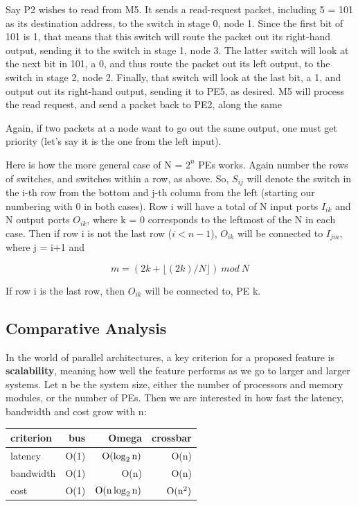 Say P2 wishes to read from M5. It sends a read-request packet, including
5 = 101 as its destination address, to the switch in stage 0, node 1.
Since the first bit of 101 is 1, that means that this switch will route
the packet out its right-hand output, sending it to the switch in stage
1, node 3. The latter switch will look at the next bit in 101, a 0, and
thus route the packet out its left output, to the switch in stage 2,
node 2. Finally, that switch will look at the last bit, a 1, and output
out its right-hand output, sending it to PE5, as desired. M5 will
process the read request, and send a packet back to PE2, along the same

Again, if two packets at a node want to go out the same output, one must
get priority (let's say it is the one from the left input).

Here is how the more general case of N = \( 2^{n} \) PEs works. Again
number the rows of switches, and switches within a row, as above. So, \(
S_{ij} \) will denote the switch in the i-th row from the bottom and
j-th column from the left (starting our numbering with 0 in both cases).
Row i will have a total of N input ports \( I_{ik} \) and N output ports
\( O_{ik} \), where k = 0 corresponds to the leftmost of the N in each
case. Then if row i is not the last row (\( i<n-1 \)), \( O_{ik} \) will
be connected to \( I_{jm} \), where j = i+1 and

\begin{equation}
m = (2k + \lfloor (2k)/N \rfloor ) ~ mod ~ N
\end{equation}

If row i is the last row, then \( O_{ik} \) will be connected to, PE k.


\subsection{Comparative Analysis}

In the world of parallel architectures, a key criterion for a proposed
feature is \textbf{scalability}, meaning how well the feature performs
as we go to larger and larger systems. Let n be the system size, either
the number of processors and memory modules, or the number of PEs. Then
we are interested in how fast the latency, bandwidth and cost grow with
n:

\begin{tabular}{|l|r|r|r|}
\hline 
criterion &
 bus &
 Omega&
 crossbar \\
\hline 
latency &
 O(1) &
 $\rm O( \log_2 n)$ &
 O(n) \\
\hline 
bandwidth &
 O(1) &
 O(n) &
 O(n) \\
\hline 
cost &
 O(1) &
 $\rm O(n \log_2 n)$ &
$\rm  O(n^2)$ \\
\hline
\end{tabular}

